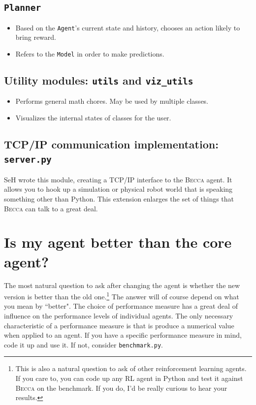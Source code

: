 \subsection{\texttt{Planner}}
\begin{itemize}
\item Based on the \texttt{Agent}'s current state and history, chooses an action likely to bring reward.
\item Refers to the \texttt{Model} in order to make predictions.
\end{itemize}

\subsection{Utility modules: \texttt{utils} and \texttt{viz\_utils}}
\begin{itemize}
\item Performs general math chores. May be used by multiple classes.
\item Visualizes the internal states of classes for the user.
\end{itemize}

\subsection{TCP/IP communication implementation: \texttt{server.py}}
SeH wrote this module, creating a TCP/IP interface to the \textsc{Becca} agent. It allows you to hook up a simulation or physical robot world that is speaking something other than Python. This extension enlarges the set of things that \textsc{Becca} can talk to a great deal.

\section{Is my agent better than the core agent?}
The most natural question to ask after changing the agent is whether the new version is better than the old one.\footnote{This is also a natural question to ask of other reinforcement learning agents. If you care to, you can code up any RL agent in Python and test it against \textsc{Becca} on the benchmark. If you do, I'd be really curious to hear your results.} The answer will of course depend on what you mean by ``better". The choice of performance measure has a great deal of influence on the performance levels of individual agents. The only necessary characteristic of a performance measure is that is produce a numerical value when applied to an agent. If you have a specific performance measure in mind, code it up and use it. If not, consider \texttt{benchmark.py}. 

